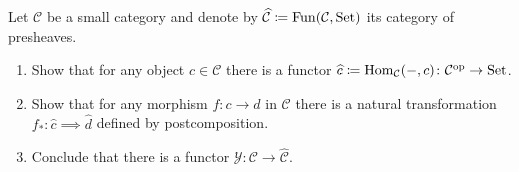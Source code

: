 \begin{Exercise}
	Let $ \mathcal{ C } $ be a small category and denote by $ \widehat{ \mathcal{ C } } \coloneqq \operatorname{Fun} ( \mathcal{ C } , \operatorname{Set} ) $ its category of presheaves.
	\begin{enumerate}[label=(\alph*)]
		\item 
		Show that for any object $ c \in \mathcal{ C } $ there is a functor $ \widehat{ c } \coloneqq \operatorname{Hom}_{ \mathcal{ C } } ( -, c ) \colon \mathcal{ C }^{\operatorname{op}} \to \operatorname{Set} $.
		
		\item 
		Show that for any morphism $ f \colon c \to d $ in $ \mathcal{ C } $ there is a natural transformation $ f_* \colon \widehat{ c } \implies \widehat{ d } $ defined by postcomposition.
		
		\item 
		Conclude that there is a functor $ \mathcal{ Y } \colon \mathcal{ C } \to \widehat{\mathcal{ C }}$.
	\end{enumerate}
\end{Exercise}

